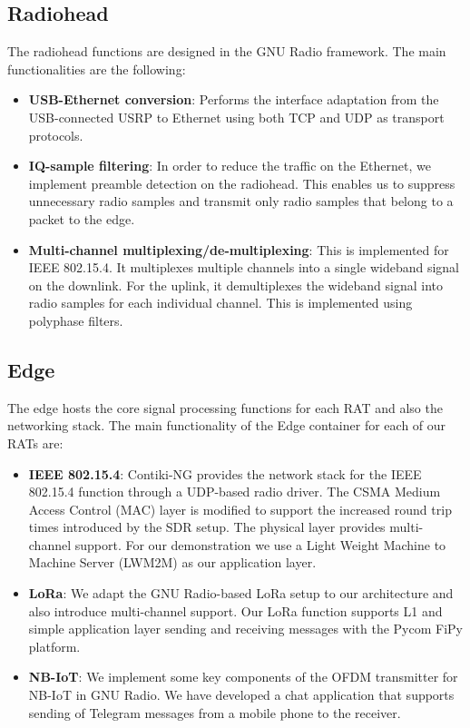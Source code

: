 \documentclass[10pt,emptycopyrightspace]{ewsn-proc}
\begin{document}
\subsection{Radiohead}
The radiohead functions are designed in the GNU Radio framework. The main functionalities are the following:
\begin{itemize}
	\item \textbf{USB-Ethernet conversion}: Performs the interface adaptation from the USB-connected USRP to Ethernet using both TCP and UDP as transport protocols.
	
	\item \textbf{IQ-sample filtering}: In order to reduce the traffic on the Ethernet, we implement preamble detection on the radiohead. This enables us to suppress unnecessary radio samples and transmit only radio samples that belong to a packet to the edge. 
	
	\item \textbf{Multi-channel multiplexing/de-multiplexing}: This is implemented for IEEE 802.15.4. It multiplexes multiple channels into a single wideband signal on the downlink. For the uplink, it demultiplexes the wideband signal into radio samples for each individual channel. This is implemented using polyphase filters.
	
\end{itemize}
\subsection{Edge}
The edge hosts the core signal processing functions for each RAT and also the networking stack. The main functionality of the Edge container for each of our RATs are:
\begin{itemize}
	\item \textbf{IEEE 802.15.4}: Contiki-NG provides the network stack for the IEEE 802.15.4 function through a UDP-based radio driver. The CSMA Medium Access Control (MAC) layer is modified to support the increased round trip times introduced by the SDR setup. The physical layer provides multi-channel support. For our demonstration we use a Light Weight Machine to Machine Server (LWM2M) as our application layer. 		
	\item \textbf{LoRa}: We adapt the GNU Radio-based LoRa setup to our architecture and also introduce multi-channel support. Our LoRa function supports L1 and simple application layer sending and receiving messages with the Pycom FiPy platform.
	

	\item \textbf{NB-IoT}: We implement some key components of the OFDM transmitter for NB-IoT in GNU Radio. We have developed a chat application that supports sending of Telegram messages from a mobile phone to the receiver.
\end{itemize}
\end{document}
